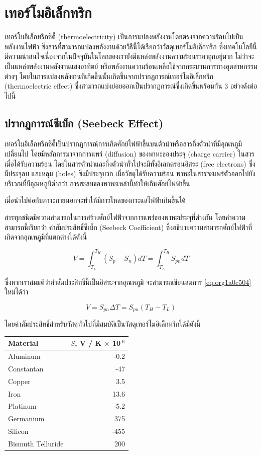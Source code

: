 \documentclass[a4paper,nobib,openany]{tufte-book}
\begin{document}
\chapter{เทอร์โมอิเล็กทริก}
\label{sec:org090d180}
เทอร์โมอิเล็กทริกซิตี้ (thermoelectricity) เป็นการแปลงพลังงานโดยตรงจากความร้อนไปเป็นพลังงานไฟฟ้า
ซึ่งสารที่สามารถแปลงพลังงานด้วยวิธีนี้ได้เรียกว่าวัสดุเทอร์โมอิเล็กทริก
ซึ่งเทคโนโลยีนี้มีความน่าสนใจเนื่องจากในปัจจุบันในโลกของเรายังมีแหล่งพลังงานความร้อนราคาถูกอยู่มาก
ไม่ว่าจะเป็นแหล่งพลังงานพลังงานแสงอาทิตย์ หรือพลังงานความร้อนเหลือใช้จากกระบวนการทางอุตสาหกรรมต่างๆ
โดยในการแปลงพลังงานที่เกิดขึ้นนั้นเกิดขึ้นจากปรากฏการณ์เทอร์โมอิเล็กทริก
(thermoelectric effect)
ซึ่งสามารถแบ่งย่อยออกเป็นปรากฏการณ์ซึ่งเกิดขึ้นพร้อมกัน 3
อย่างดังต่อไปนี้

\section{ปรากฏการณ์ซีเบ็ก (Seebeck Effect)}
\label{sec:org6862c9e}
เทอร์โมอิเล็กทริกซิตี้เป็นปรากฏการณ์การเกิดศักย์ไฟฟ้าขึ้นบนตัวนำหรือสารกึ่งตัวนำที่มีอุณหภูมิเปลี่ยนไป
โดยมีหลักการมาจากการแพร่ (diffusion) ของพาหะของประจุ (charge carrier)
ในสารเมื่อได้รับความร้อน
โดยในสารตัวนำและกึ่งตัวนำทั่วไปจะมีทั้งอิเลกตรอนอิสระ (free electrons)
ซึ่งมีประจุลบ และหลุม (holes) ซึ่งมีประจุบวก เมื่อวัสดุได้รับความร้อน
พาหะในสารจะแพร่ตัวออกไปยังบริเวณที่มีอุณหภูมิต่ำกว่า
การสะสมของพาหะเหล่านี้ทำให้เกินศักย์ไฟฟ้าขึ้น

เมื่อนำไปต่อกับภาระภายนอกจะทำให้มีการไหลของกระแสไฟฟ้าเกินขึ้นได้

สารทุกชนิดมีความสามารถในการสร้างศักย์ไฟฟ้าจากการแพร่ของพาหะประจุที่ต่างกัน
โดยค่าความสามารถนี้เรียกว่า ค่าสัมประสิทธิ์ซีเบ็ก (Seebeck Coefficient)
ซึ่งอธิบายความสามารถศักย์ไฟฟ้าที่เกิดจากอุณหภูมิที่แตกต่างได้ดังนี้

\begin{equation}
\label{eq:org1a0c504}
  V = \int_{T_L}^{T_H} \left( S_p - S_n \right) dT = \int_{T_L}^{T_H} S_{pn} dT
\end{equation}

ซึ่งหากเราสมมติว่าค่าสัมประสิทธิ์นี้เป็นอิสระจากอุณหภูมิ จะสามารถเขียนสมการ \ref{eq:org1a0c504} ใหม่ได้ว่า

\[V = S_{pn} \Delta T = S_{pn} \left( T_H - T_L \right)\]

โดยค่าสัมประสิทธิ์สำหรับวัสดุทั่วไปที่มีสมบัติเป็นวัสดุเทอร์โมอิเล็กทริกได้มีดังนี้

\begin{center}
\begin{tabular}{lr}
\toprule
Material & \(S\), V / K \(\times\) 10\(^{\text{-6}}\)\\
\midrule
Aluminum & -0.2\\
Constantan & -47\\
Copper & 3.5\\
Iron & 13.6\\
Platinum & -5.2\\
Germanium & 375\\
Silicon & -455\\
Bismuth Telluride & 200\\
\bottomrule
\end{tabular}
\end{center}
\end{document}

